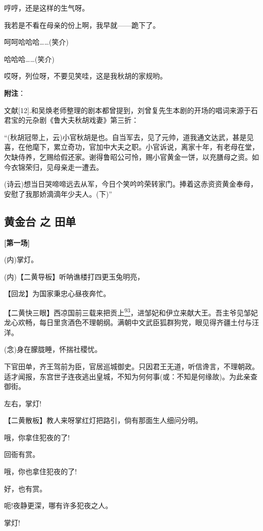 哼哼，还是这样的生气呀。

我若是不看在母亲的份上啊，我早就------跪下了。

呵呵哈哈哈\ldots{}\ldots{}(笑介)

哈哈哈\ldots{}\ldots{}(笑介)

哎呀，列位呀，不要见笑哇，这是我秋胡的家规哟。

\textbf{附注}：

文献{[}12{]}.和吴焕老师整理的剧本都曾提到，刘曾复先生本剧的开场的唱词来源于石君宝的元杂剧《鲁大夫秋胡戏妻》第三折：

``(秋胡冠带上，云)小官秋胡是也。自当军去，见了元帅，道我通文达武，甚是见喜，在他麾下，累立奇功，官加中大夫之职。小官诉说，离家十年，有老母在堂，欠缺侍养，乞赐给假还家。谢得鲁昭公可怜，赐小官黄金一饼，以充膳母之资。如今衣锦荣归，见母亲走一遭去。

(诗云)想当日哭啼啼远去从军，今日个笑吟吟荣转家门。捧着这赤资资黄金奉母，安慰了我那娇滴滴年少夫人。(下)''

\newpage
\hypertarget{ux9ec4ux91d1ux53f0-ux4e4b-ux7530ux5355}{%
\subsection{黄金台 之
田单}\label{ux9ec4ux91d1ux53f0-ux4e4b-ux7530ux5355}}

\textbf{{[}第一场{]}}

(内)掌灯。

(内)【二黄导板】听呐谯楼打四更玉兔明亮，

【回龙】为国家秉忠心昼夜奔忙。

【二黄快三眼】西凉国前三载来把贡上\protect\hyperlink{fn93}{\textsuperscript{93}}，进邹妃和伊立来献大王。吾主爷见邹妃龙心欢畅，每日里贪酒色不理朝纲。满朝中文武臣狐群狗党，眼见得齐疆土付与汪洋。

(念)身在朦胧睡，怀揣社稷忧。

下官田单，齐王驾前为臣，官居巡城御史。只因君王无道，听信谗言，不理朝政。适才闻报，东宫世子连夜逃出皇城，不知为何何事(或：不知是何缘故)。为此亲查御街。

左右，掌灯!

【二黄散板】教人来呀掌红灯把路引，倘有那面生人细问分明。

哦，你拿住犯夜的了!

回衙有赏。

哦，你也拿住犯夜的了!

好，也有赏。

呃!夜静更深，哪有许多犯夜之人。

掌灯!

